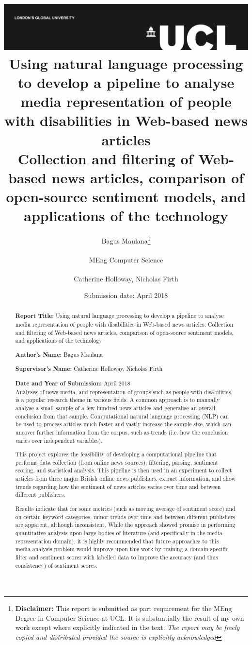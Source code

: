 \documentclass{report}
\title{{\vspace{-14em} \includegraphics[scale=0.4]{ucl_logo.png}}\\
{{\Huge Using natural language processing to develop a pipeline to analyse media representation of people with disabilities in Web-based news articles}}\\
{\large Collection and filtering of Web-based news articles, comparison of open-source sentiment models, and applications of the technology
}\\
}
\date{Submission date: \nth{30} April 2018}
\author{Bagus Maulana\thanks{
{\bf Disclaimer:}
This report is submitted as part requirement for the MEng Degree in Computer Science at UCL. It is
substantially the result of my own work except where explicitly indicated in the text.
\emph{The report may be freely copied and distributed provided the source is explicitly acknowledged}}
\\ \\
MEng Computer Science\\ \\
Catherine Holloway, Nicholas Firth}
\begin{document}
 
\onehalfspacing
\maketitle
\begin{abstract}

\textbf{Report Title:}  Using natural language processing to develop a pipeline to analyse media representation of people with disabilities in Web-based news articles: Collection and filtering of Web-based news articles, comparison of open-source sentiment models, and applications of the technology

\textbf{Author’s Name:} Bagus Maulana

\textbf{Supervisor’s Name:} Catherine Holloway, Nicholas Firth

\textbf{Date and Year of Submission:}  April 2018\\

Analyses of news media, and representation of groups such as people with disabilities, is a popular research theme in various fields. 
A common approach is to manually analyse a small sample of a few hundred news articles and generalise an overall conclusion from that sample. 
Computational natural language processing (NLP) can be used to process articles much faster and vastly increase the sample size, which can uncover further information from the corpus, such as trends (i.e. how the conclusion varies over independent variables).

This project explores the feasibility of developing a computational pipeline that performs data collection (from online news sources), filtering, parsing, sentiment scoring, and statistical analysis.
This pipeline is then used in an experiment to collect articles from three major British online news publishers, extract information, and show trends regarding how the sentiment of news articles varies over time and between different publishers.

Results indicate that for some metrics (such as moving average of sentiment score) and on certain keyword categories, minor trends over time and between different publishers are apparent, although inconsistent. 
While the approach showed promise in performing quantitative analysis upon large bodies of literature (and specifically in the media-representation domain), it is highly recommended that future approaches to this media-analysis problem would improve upon this work by training a domain-specific filter and sentiment scorer with labelled data to improve the accuracy (and thus consistency) of sentiment scores.

\end{abstract}
\tableofcontents
\setcounter{page}{1}
\end{document}
